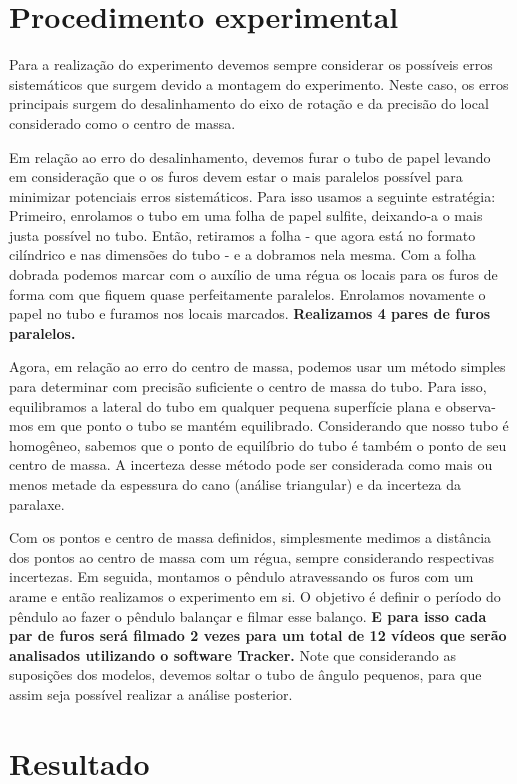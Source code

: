 \documentclass[a4paper]{report}
\begin{document}
\section*{Procedimento experimental}

\qquad Para a realização do experimento devemos sempre considerar os possíveis erros sistemáticos que surgem devido a montagem do experimento. Neste caso, os erros principais surgem do desalinhamento do eixo de rotação e da precisão do local considerado como o centro de massa.

\qquad Em relação ao erro do desalinhamento, devemos furar o tubo de papel levando em consideração que o os furos devem estar o mais paralelos possível para minimizar potenciais erros sistemáticos. Para isso usamos a seguinte estratégia: Primeiro, enrolamos o tubo em uma folha de papel sulfite, deixando-a o mais justa possível no tubo. Então, retiramos a folha - que agora está no formato cilíndrico e nas dimensões do tubo - e a dobramos nela mesma. Com a folha dobrada podemos marcar com o auxílio de uma régua os locais para os furos de forma com que fiquem quase perfeitamente paralelos. Enrolamos novamente o papel no tubo e furamos nos locais marcados.\textbf{ Realizamos 4 pares de furos paralelos.}

\qquad Agora, em relação ao erro do centro de massa, podemos usar um método simples para determinar com precisão suficiente o centro de massa do tubo. Para isso, equilibramos a lateral do tubo em qualquer pequena superfície plana e observa-mos em que ponto o tubo se mantém equilibrado. Considerando que nosso tubo é homogêneo, sabemos que o ponto de equilíbrio do tubo é também o ponto de seu centro de massa. A incerteza desse método pode ser considerada como mais ou menos metade da espessura do cano (análise triangular) e da incerteza da paralaxe.

\qquad Com os pontos e centro de massa definidos, simplesmente medimos a distância dos pontos ao centro de massa com um régua, sempre considerando respectivas incertezas. Em seguida, montamos o pêndulo atravessando os furos com um arame e então realizamos o experimento em si. O objetivo é definir o período do pêndulo ao fazer o pêndulo balançar e filmar esse balanço.\textbf{ E para isso cada par de furos será filmado 2 vezes para um total de 12 vídeos que serão analisados utilizando o software Tracker.} Note que considerando as suposições dos modelos, devemos soltar o tubo de ângulo pequenos, para que assim seja possível realizar a análise posterior.
\section*{Resultado}
\end{document}
